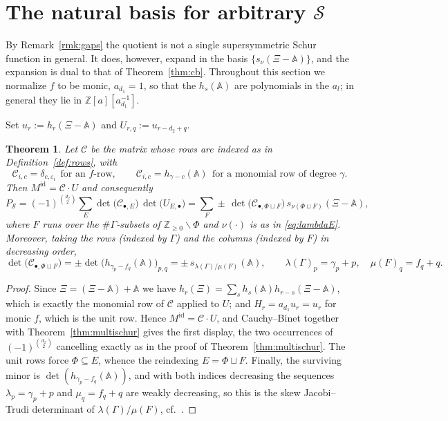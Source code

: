 \documentclass[11pt,reqno]{amsart}
\theoremstyle{plain}
\newtheorem{theorem}{Theorem}[section]
\theoremstyle{definition}
\newcommand{\bA}{\mathbb{A}}
\newcommand{\bX}{\Xi}
\newcommand{\cS}{\mathcal{S}}
\newcommand{\cC}{\mathcal{C}}
\newcommand{\ZZ}{\mathbb{Z}}
\begin{document}
\section{The natural basis for arbitrary $\cS$}\label{sec:skew}

By Remark~\ref{rmk:gaps} the quotient is not a single supersymmetric Schur
function in general. It does, however, expand in the basis
$\{s_\nu(\bX-\bA)\}$, and the expansion is dual to that of Theorem~\ref{thm:cb}.
Throughout this section we normalize $f$ to be monic, $a_{d_1}=1$, so that the
$h_s(\bA)$ are polynomials in the $a_l$; in general they lie in
$\ZZ[a][a_{d_1}^{-1}]$.

Set $u_r:=h_r(\bX-\bA)$ and $U_{r,q}:=u_{r-d_2+q}$.

\begin{theorem}\label{thm:skew}
Let $\cC$ be the matrix whose rows are indexed as in Definition~\ref{def:rows},
with
\[
  \cC_{i,c}=\delta_{c,\varepsilon_i}\ \ \text{for an $f$-row},\qquad
  \cC_{i,c}=h_{\gamma-c}(\bA)\ \ \text{for a monomial row of degree }\gamma .
\]
Then $M^{\mathrm{id}}=\cC\cdot U$ and consequently
\[
  P_\cS=(-1)^{\binom{d_2}{2}}\sum_{E}\det\big(\cC_{\bullet,E}\big)\,
        \det\big(U_{E,\bullet}\big)
      =\sum_{F}\pm\,\det\big(\cC_{\bullet,\Phi\sqcup F}\big)\,
        s_{\nu(\Phi\sqcup F)}(\bX-\bA),
\]
where $F$ runs over the $\#\Gamma$-subsets of $\ZZ_{\ge0}\smallsetminus\Phi$ and
$\nu(\cdot)$ is as in \eqref{eq:lambdaE}. Moreover, taking the rows (indexed by
$\Gamma$) and the columns (indexed by $F$) in decreasing order,
\[
  \det\big(\cC_{\bullet,\Phi\sqcup F}\big)
  =\pm\det\big(h_{\gamma_p-f_q}(\bA)\big)_{p,q}
  =\pm\,s_{\lambda(\Gamma)/\mu(F)}(\bA),
  \qquad
  \lambda(\Gamma)_p=\gamma_p+p,\quad \mu(F)_q=f_q+q .
\]
\end{theorem}

\begin{proof}
Since $\bX=(\bX-\bA)+\bA$ we have $h_r(\bX)=\sum_s h_s(\bA)h_{r-s}(\bX-\bA)$,
which is exactly the monomial row of $\cC$ applied to $U$; and
$H_r=a_{d_1}u_r=u_r$ for monic $f$, which is the unit row. Hence
$M^{\mathrm{id}}=\cC\cdot U$, and Cauchy--Binet together with
Theorem~\ref{thm:multischur} gives the first display, the two occurrences of
$(-1)^{\binom{d_2}{2}}$ cancelling exactly as in the proof of
Theorem~\ref{thm:multischur}. The unit rows force $\Phi\subseteq E$, whence the
reindexing $E=\Phi\sqcup F$. Finally, the surviving minor is
$\det(h_{\gamma_p-f_q}(\bA))$, and with both indices decreasing the sequences
$\lambda_p=\gamma_p+p$ and $\mu_q=f_q+q$ are weakly decreasing, so this is the
skew Jacobi--Trudi determinant of $\lambda(\Gamma)/\mu(F)$, cf.\
\cite[I.(5.4)]{Macdonald}.
\end{proof}
\end{document}
